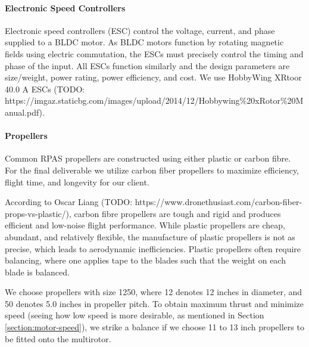 \paragraph{Electronic Speed Controllers}

Electronic speed controllers (ESC) control the voltage, current, and phase supplied to a BLDC motor. As BLDC motors function by rotating magnetic fields using electric commutation, the ESCs must precisely control the timing and phase of the input. All ESCs function similarly and the design parameters are size/weight, power rating, power efficiency, and cost. We use HobbyWing XRtoor 40.0 A  ESCs (TODO: https://imgaz.staticbg.com/images/upload/2014/12/Hobbywing\%20xRotor\%20Manual.pdf).

\paragraph{Propellers}

Common RPAS propellers are constructed using either plastic or carbon fibre. For the final deliverable we utilize carbon fiber propellers to maximize efficiency, flight time, and longevity for our client. 

According to Oscar Liang (TODO: https://www.dronethusiast.com/carbon-fiber-props-vs-plastic/),  carbon fibre propellers are tough and rigid and produces efficient and low-noise flight performance.  While plastic propellers are cheap, abundant, and relatively flexible, the manufacture of plastic propellers is not as precise, which leads to aerodynamic inefficiencies. Plastic propellers often require balancing, where one applies tape to the blades such that the weight on each blade is balanced. 

We choose propellers with size 1250, where 12 denotes 12 inches in diameter, and 50 denotes 5.0 inches in propeller pitch. To obtain maximum thrust and minimize speed (seeing how low speed is more desirable, as mentioned in Section \ref{section:motor-speed}), we strike a balance if we choose 11 to 13 inch propellers to be fitted onto the multirotor.


